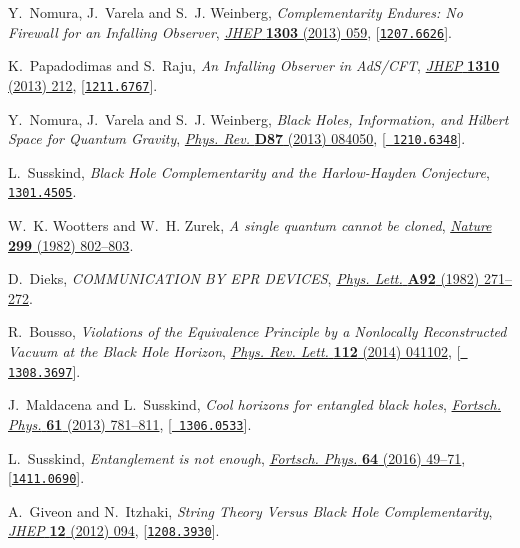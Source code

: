 \documentclass[12pt]{article}
\begin{document}
\begin{thebibliography}{100}
Y.~Nomura, J.~Varela and S.~J. Weinberg, \emph{{Complementarity Endures: No
  Firewall for an Infalling Observer}},
  \href{http://dx.doi.org/10.1007/JHEP03(2013)059}{\emph{JHEP} {\bf 1303}
  (2013) 059}, [\href{http://arxiv.org/abs/1207.6626}{{\tt 1207.6626}}].

K.~Papadodimas and S.~Raju, \emph{{An Infalling Observer in AdS/CFT}},
  \href{http://dx.doi.org/10.1007/JHEP10(2013)212}{\emph{JHEP} {\bf 1310}
  (2013) 212}, [\href{http://arxiv.org/abs/1211.6767}{{\tt 1211.6767}}].

Y.~Nomura, J.~Varela and S.~J. Weinberg, \emph{{Black Holes, Information, and
  Hilbert Space for Quantum Gravity}},
  \href{http://dx.doi.org/10.1103/PhysRevD.87.084050}{\emph{Phys. Rev.} {\bf
  D87} (2013) 084050}, [\href{http://arxiv.org/abs/1210.6348}{{\tt
  1210.6348}}].

L.~Susskind, \emph{{Black Hole Complementarity and the Harlow-Hayden
  Conjecture}},  \href{http://arxiv.org/abs/1301.4505}{{\tt 1301.4505}}.

W.~K. Wootters and W.~H. Zurek, \emph{{A single quantum cannot be cloned}},
  \href{http://dx.doi.org/10.1038/299802a0}{\emph{Nature} {\bf 299} (1982)
  802--803}.

D.~Dieks, \emph{{COMMUNICATION BY EPR DEVICES}},
  \href{http://dx.doi.org/10.1016/0375-9601(82)90084-6}{\emph{Phys. Lett.} {\bf
  A92} (1982) 271--272}.

R.~Bousso, \emph{{Violations of the Equivalence Principle by a Nonlocally
  Reconstructed Vacuum at the Black Hole Horizon}},
  \href{http://dx.doi.org/10.1103/PhysRevLett.112.041102}{\emph{Phys. Rev.
  Lett.} {\bf 112} (2014) 041102}, [\href{http://arxiv.org/abs/1308.3697}{{\tt
  1308.3697}}].

J.~Maldacena and L.~Susskind, \emph{{Cool horizons for entangled black holes}},
  \href{http://dx.doi.org/10.1002/prop.201300020}{\emph{Fortsch. Phys.} {\bf
  61} (2013) 781--811}, [\href{http://arxiv.org/abs/1306.0533}{{\tt
  1306.0533}}].

L.~Susskind, \emph{{Entanglement is not enough}},
  \href{http://dx.doi.org/10.1002/prop.201500095}{\emph{Fortsch. Phys.} {\bf
  64} (2016) 49--71}, [\href{http://arxiv.org/abs/1411.0690}{{\tt 1411.0690}}].

A.~Giveon and N.~Itzhaki, \emph{{String Theory Versus Black Hole
  Complementarity}},
  \href{http://dx.doi.org/10.1007/JHEP12(2012)094}{\emph{JHEP} {\bf 12} (2012)
  094}, [\href{http://arxiv.org/abs/1208.3930}{{\tt 1208.3930}}].


\end{thebibliography}
\end{document}
